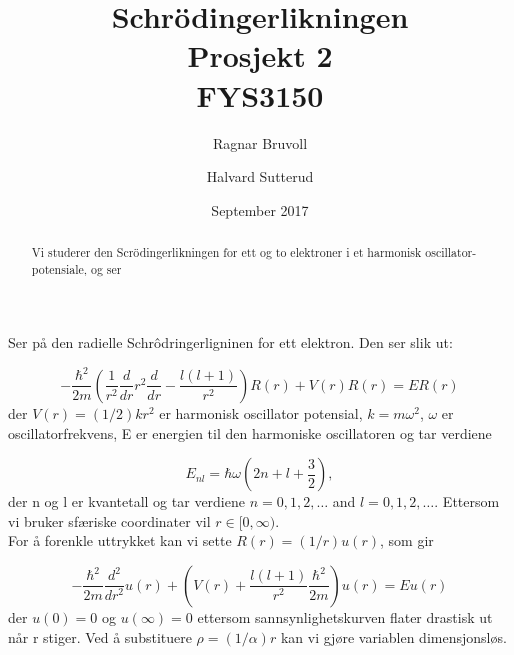 \documentclass[12pt]{article}
\begin{document}
\title{Schrödingerlikningen
\\ Prosjekt 2
\\ FYS3150}
\author{Ragnar Bruvoll \and Halvard Sutterud}
\date{September 2017}
\maketitle{\begin{center}\end{center}}
\thispagestyle{empty}

\begin{abstract}
    Vi studerer den Scrödingerlikningen for ett og to elektroner i et
    harmonisk oscillator-potensiale, og ser
\end{abstract}
\newpage
{}



Ser på den radielle Schrôdringerligninen for ett elektron. Den ser slik ut:

\begin{equation*}
  -\frac{\hbar^2}{2 m} \left ( \frac{1}{r^2} \frac{d}{dr} r^2
  \frac{d}{dr} - \frac{l (l + 1)}{r^2} \right )R(r) 
     + V(r) R(r) = E R(r)
\end{equation*}
der  $V(r) = (1/2)kr^2$ er harmonisk oscillator potensial, $k=m\omega^2$,
$\omega$ er oscillatorfrekvens, E er energien til den harmoniske
oscillatoren og tar verdiene

\begin{equation*}
E_{nl}=  \hbar \omega \left(2n+l+\frac{3}{2}\right),
\end{equation*}
der n og l er kvantetall og tar verdiene $n=0,1,2,\dots$ and
$l=0,1,2,\dots$. Ettersom vi bruker sfæriske coordinater vil $r\in
[0,\infty)$.\\

For å forenkle uttrykket kan vi sette $R(r) = (1/r) u(r)$, som gir

\begin{equation*}
  -\frac{\hbar^2}{2 m} \frac{d^2}{dr^2} u(r) + \left ( V(r) + \frac{l (l + 1)}{r^2}\frac{\hbar^2}{2 m}\right ) u(r)  = E u(r)
\end{equation*}
der $u(0)=0$ og $u(\infty)=0$ ettersom sannsynlighetskurven flater drastisk
ut når r stiger. Ved å substituere $\rho = (1/\alpha) r$ kan vi gjøre
variablen dimensjonsløs.
\end{document}
